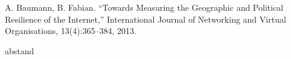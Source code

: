 \documentclass[conference, 11pt]{IEEEtran}
\begin{document}
\begin{thebibliography}{00}
A. Baumann, B. Fabian. ``Towards Measuring the Geographic and Political Resilience of the Internet,'' International Journal of Networking and Virtual Organisations, 13(4):365–384, 2013.














abstand\\


 


\end{thebibliography}
\end{document}
